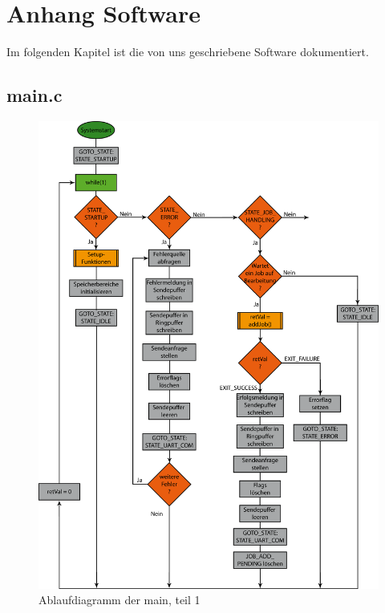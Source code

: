 

\section{Anhang Software}
Im folgenden Kapitel ist die von uns geschriebene Software dokumentiert.




\subsection{main.c}


\begin{figure}[h]
\includegraphics[scale = 0.8]{./main1.png}
\hspace{-14pt}
\caption{Ablaufdiagramm der main, teil 1}
\end{figure} 

